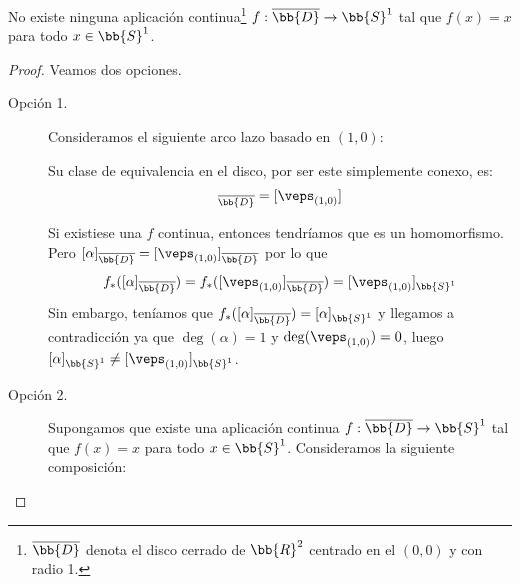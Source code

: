 \begin{prop}\label{prop1-12}%
    No existe ninguna aplicación continua\footnote{$\overline{\bb{D}}$ denota el disco cerrado de $\bb{R}^2$ centrado en el $(0,0)$ y con radio 1.} $f : \overline{\bb{D}} \to \bb{S}^1$ tal que $f(x) = x$ para todo $x\in \bb{S}^1$.
    \begin{proof}
        Veamos dos opciones.
        \begin{description}
            \item[Opción 1.] Consideramos el siguiente arco lazo basado en $(1,0)$:
            
            Su clase de equivalencia en el disco, por ser este simplemente conexo, es:
            \begin{gather*}
                [\alpha]_{\overline{\bb{D}}} = [\veps_{(1,0)}]
            \end{gather*}
            
            Si existiese una $f$ continua, entonces tendríamos que
            es un homomorfismo. Pero $[\alpha]_{\overline{\bb{D}}} = [\veps_{(1,0)}]_{\overline{\bb{D}}}$ por lo que 
            \begin{gather*}
                f_*([\alpha]_{\overline{\bb{D}}}) = f_*([\veps_{(1,0)}]_{\overline{\bb{D}}}) = [\veps_{(1,0)}]_{\bb{S}^1}
            \end{gather*}
            Sin embargo, teníamos que $f_*([\alpha]_{\overline{\bb{D}}}) = [\alpha]_{\bb{S}^1}$ y llegamos a contradicción ya que $\deg(\alpha) = 1$ y $\deg(\veps_{(1,0)}) = 0$, luego $[\alpha]_{\bb{S}^1} \neq [\veps_{(1,0)}]_{\bb{S}^1}$.
            
            \item[Opción 2.] Supongamos que existe una aplicación continua $f:\overline{\bb{D}}\to \bb{S}^1$ tal que $f(x) = x$ para todo $x\in \bb{S}^1$. Consideramos la siguiente composición:
            \begin{center}
            \end{center}


\end{description}
\end{proof}
\end{prop}
